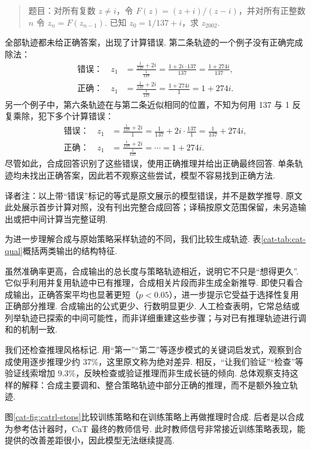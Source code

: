 \begin{quote}
题目：对所有复数 $z\ne i$，令 $F(z)=(z+i)/(z-i)$，并对所有正整数 $n$ 令 $z_n=F(z_{n-1})$. 已知 $z_0=1/137+i$，求 $z_{2002}$.
\end{quote}
全部轨迹都未给正确答案，出现了计算错误. 第二条轨迹的一个例子没有正确完成除法：
\begin{align*}
\text{错误：}\quad z_1&=\frac{\frac1{137}+2i}{\frac1{137}}
=\frac{1+2i\cdot137}{137}=\frac{1+274i}{137},\\
\text{正确：}\quad z_1&=\frac{\frac1{137}+2i}{\frac1{137}}
=\frac{1+274i}{1}=1+274i.
\end{align*}
另一个例子中，第六条轨迹在与第二条近似相同的位置，不知为何用 137 与 1 反复乘除，犯下多个计算错误：
\begin{align*}
\text{错误：}\quad z_1&=\frac{\frac1{137}+2i}{1}
=\frac1{137}+2i\cdot\frac{137}{1}=\frac1{137}+274i,\\
\text{正确：}\quad z_1&=\frac{\frac1{137}+2i}{\frac1{137}}
=\cdots=1+274i.
\end{align*}
尽管如此，合成回答识别了这些错误，使用正确推理并给出正确最终回答. 单条轨迹均未找出正确答案，因此若不观察这些尝试，模型不容易找到正确方法.
\begin{remark}
译者注：以上带“错误”标记的等式是原文展示的模型错误，并不是数学推导. 原文此处展示首步计算对照，没有刊出完整合成回答；译稿按原文范围保留，未另造输出或把中间计算当完整证明.
\end{remark}

为进一步理解合成与原始策略采样轨迹的不同，我们比较生成轨迹. 表\ref{cat-tab:cat-qual}概括两类输出的结构特征.

虽然准确率更高，合成输出的总长度与策略轨迹相近，说明它不只是“想得更久”. 它似乎利用并复用轨迹中已有推理，合成相关片段而非生成全新推导. 即使只看合成输出，正确答案平均也显著更短（$p<0.05$），进一步提示它受益于选择性复用正确部分推理. 合成输出的公式更少、行数明显更少. 人工检查表明，它常总结或列举轨迹已探索的中间可能性，而非详细重建这些步骤；与对已有推理轨迹进行调和的机制一致.

我们还检查推理风格标记. 用“第一”“第二”等逐步模式的关键词启发式，观察到合成使用逐步推理少约 37\%，这里原文称为绝对差异. 相反，“让我们验证”“检查”等验证线索增加 9.3\%，反映检查或验证推理而非生成长链的倾向. 总体观察支持这样的解释：合成主要调和、整合策略轨迹中部分正确的推理，而不是额外独立轨迹.

图\ref{cat-fig:catrl-stops}比较训练策略和在训练策略上再做推理时合成. 后者是以合成为参考估计器时，CaT 最终的教师信号. 此时教师信号非常接近训练策略表现，能提供的改善差距很小，因此模型无法继续提高.

